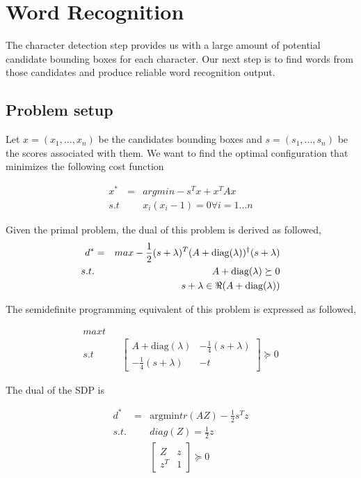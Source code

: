 \documentclass[10pt,twocolumn,letterpaper]{article}
\begin{document}
\section{Word Recognition}

The character detection step provides us with a large amount of potential candidate bounding boxes for each character. Our next step is to find words from those candidates and produce reliable word recognition output.

\subsection{Problem setup}

Let $x=(x_{1},...,x_{n})$ be the candidates bounding boxes and $s=(s_{1},...,s_{n})$
be the scores associated with them. We want to find the optimal configuration
that minimizes the following cost function

\begin{eqnarray*}
x^{*} & = & argmin-s^{T}x+x^{T}Ax\\
s.t &  & x_{i}(x_{i}-1)=0\forall i=1...n
\end{eqnarray*}

Given the primal problem, the dual of this problem is derived as followed,
\begin{eqnarray*}
d^{*} & = & max-\frac{1}{2}(s+\lambda)^{T}(A+\mbox{diag}(\lambda))^{\dagger}(s+\lambda)\\
s.t. &  & A+\mbox{diag}(\lambda)\succeq0\\
 &  & s+\lambda\in\Re(A+\mbox{diag(\ensuremath{\lambda}))}
\end{eqnarray*}


The semidefinite programming equivalent of this problem is expressed as followed,

\begin{eqnarray*}
max t\\
s.t &  & \left[\begin{array}{cc}
A+\mbox{diag}(\lambda) & -\frac{1}{4}(s+\lambda)\\
-\frac{1}{4}(s+\lambda) & -t
\end{array}\right]\succeq0
\end{eqnarray*}

The dual of the SDP is

\begin{eqnarray*}
d^{*} & = & \mbox{argmin}tr(AZ)-\frac{1}{2}s^{T}z\\
s.t. &  & diag(Z)=\frac{1}{2}z\\
 &  & \left[\begin{array}{cc}
Z & z\\
z^{T} & 1
\end{array}\right]\succeq0
\end{eqnarray*}
\end{document}
